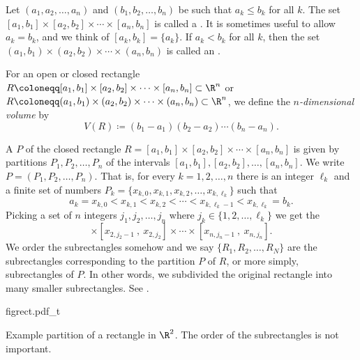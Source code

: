 \begin{defn}
Let $(a_1,a_2,\ldots,a_n)$ and
$(b_1,b_2,\ldots,b_n)$ be such that $a_k \leq b_k$ for all $k$.
The set
$[a_1,b_1] \times
[a_2,b_2] \times \cdots \times
[a_n,b_n]$ is called a \emph{}.
It is sometimes useful to allow $a_k = b_k$, and we
think of $[a_k,b_k] = \{ a_k \}$.
If $a_k < b_k$ for all $k$, then the set
$(a_1,b_1) \times
(a_2,b_2) \times \cdots \times
(a_n,b_n)$ is called an \emph{}.

For an open or closed rectangle
$R \coloneqq [a_1,b_1] \times
[a_2,b_2] \times \cdots \times
[a_n,b_n] \subset \R^n$
or
$R \coloneqq (a_1,b_1) \times
(a_2,b_2) \times \cdots \times
(a_n,b_n) \subset \R^n$,
we define the
\emph{$n$-dimensional volume}%
%
 by
\begin{equation*}
V(R) \coloneqq
(b_1-a_1)
(b_2-a_2)
\cdots
(b_n-a_n) .
\end{equation*}

A \emph{} $P$ of the closed rectangle
$R = [a_1,b_1] \times
[a_2,b_2] \times \cdots \times
[a_n,b_n]$
is given by
partitions $P_1,P_2,\ldots,P_n$ of the intervals
$[a_1,b_1], [a_2,b_2],\ldots, [a_n,b_n]$.
We write $P=(P_1,P_2,\ldots,P_n)$.
That is, for every $k=1,2,\ldots,n$ there is an integer $\ell_k$ and
a finite set of numbers
$P_k = \{ x_{k,0},x_{k,1},x_{k,2},\ldots,x_{k,\ell_k} \}$ such that
\begin{equation*}
a_k = x_{k,0} < x_{k,1} < x_{k,2} < \cdots < x_{k,{\ell_k}-1} < x_{k,\ell_k} = b_k .
\end{equation*}
Picking a set of $n$ integers $j_1,j_2,\ldots,j_n$ where
$j_k \in \{ 1,2,\ldots,\ell_k \}$ we get
the
\emph{}
\begin{equation*}
[x_{1,j_1-1}~,~ x_{1,j_1}]
\times
[x_{2,j_2-1}~,~ x_{2,j_2}]
\times
\cdots
\times
[x_{n,j_n-1}~,~ x_{n,j_n}] .
\end{equation*}
We order the subrectangles somehow and
we say $\{R_1,R_2,\ldots,R_N\}$ are the subrectangles corresponding
to the partition $P$ of $R$, or more simply, subrectangles of
$P$.
In other words, we subdivided the original rectangle into many smaller
subrectangles.  See .

\begin{myfigureht}
{figrect.pdf_t}
\caption{Example partition of a rectangle in $\R^2$.  The order of the
subrectangles is not important.\label{mv:figrect}}
\end{myfigureht}


\end{defn}
